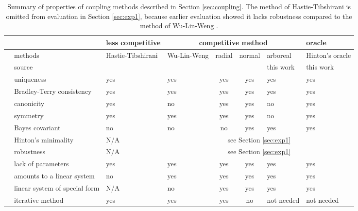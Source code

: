 
\begin{table}[!ht]
	\begin{tabular}{cm{2.5cm}|m{1.5cm}|m{1.5cm}ccm{1.5cm}|m{1.5cm}}
		&& less competitive & \multicolumn{4}{c|}{competitive method} & oracle \\
		\hline 
		&methods & Hastie-Tibshirani & Wu-Lin-Weng & radial & normal & arboreal & Hinton's oracle \\
		\hline 
		&source & \cite{hastie1998classification} & \cite{wu2004probability} & \cite{vsuch2015new} & \cite{vsuch2016bayes} & this work & this work \\
		\multirow{5}{*}{\begin{turn}{90}\makecell{exact}\end{turn}}
		&uniqueness &  yes & yes & yes & yes & yes & yes \\
		&Bradley-Terry consistency & yes & yes & yes & yes & yes & yes \\
		&canonicity & yes & no & yes & yes & no & yes \\
		&symmetry & yes & yes & yes & yes & no & yes \\
		& Bayes covariant & no & no & no & yes & yes & yes \\
		\hline
		\multirow{5}{*}{\begin{turn}{90}\makecell{non-exact}\end{turn}}
		&Hinton's minimality & N/A & \multicolumn{5}{c}{see Section \ref{sec:exp1}} \\
		&robustness & N/A & \multicolumn{5}{c}{see Section \ref{sec:exp1}} \\
		&lack of parameters & yes & yes & yes & yes & yes & yes \\
		& amounts to a linear system & no & yes & yes & yes & yes & yes\\
		& linear system of special form & N/A & no & yes & yes & yes & yes \\
		& iterative method & yes & yes & yes & no & not needed & not needed\\
		\hline
	\end{tabular}
	\caption{Summary of properties of coupling methods described in Section \ref{sec:coupling}. The method of Hastie-Tibshirani is omitted from evaluation in Section \ref{sec:exp1}, because earlier evaluation showed it lacks robustness compared to the method of Wu-Lin-Weng \cite{wu2004probability}.}
	\label{tab:summaryCoupling}
\end{table}


